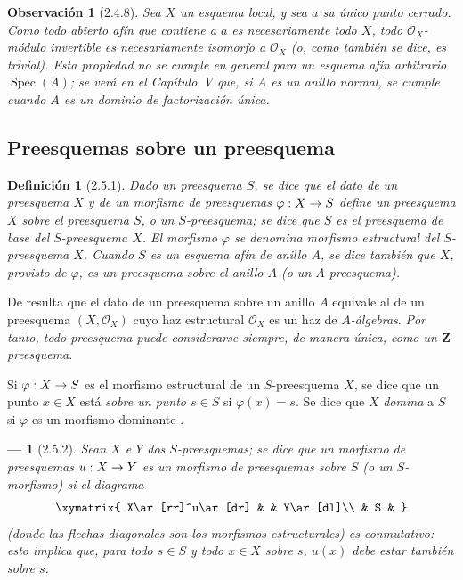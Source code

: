 \documentclass[oneside]{amsart}
\theoremstyle{ega-env-style}
\newtheorem*{env}{---}
\theoremstyle{ega-thm-env-style}
\theoremstyle{ega-defn-env-style}
\newtheorem*{definition}{Definición}
\newtheorem*{remark}{Observación}
\renewcommand{\to}{\mathchoice{\longrightarrow}{\rightarrow}{\rightarrow}{\rightarrow}}
\let\EGAOriginalLabel\label
\renewcommand{\label}[1]{\phantomsection\EGAOriginalLabel{#1}}
\begin{document}
\begin{remark}[2.4.8]
\label{I.2.4.8}
Sea $X$ un esquema local, y sea $a$ su único punto cerrado.
Como todo abierto afín que contiene a $a$ es necesariamente todo $X$, todo $\mathscr{O}_X$-módulo \emph{invertible}  es necesariamente \emph{isomorfo a $\mathscr{O}_X$} (o, como también se dice, es \emph{trivial}).
Esta propiedad no se cumple en general para un esquema afín arbitrario $\operatorname{Spec}(A)$;
se verá en el Capítulo~V que, si $A$ es un anillo normal, se cumple cuando $A$ es un dominio de factorización única.
\end{remark}

\subsection{Preesquemas sobre un preesquema}
\label{subsection:I.2.5}

\begin{definition}[2.5.1]
\label{I.2.5.1}
Dado un preesquema $S$, se dice que el dato de un preesquema $X$ y de un morfismo de preesquemas $\varphi:X\to S$ define un preesquema $X$ \emph{sobre el preesquema $S$}, o un $S$-preesquema;
se dice que $S$ es el preesquema de base del $S$-preesquema $X$.
El morfismo $\varphi$ se denomina morfismo estructural del $S$-preesquema $X$.
Cuando $S$ es un esquema afín de anillo $A$, se dice también que $X$, provisto de $\varphi$, es un preesquema \textup{sobre el anillo} $A$ (o un \emph{$A$-preesquema}).
\end{definition}

De  resulta que el dato de un preesquema sobre un anillo $A$ equivale al de un preesquema $(X,\mathscr{O}_X)$ cuyo haz estructural $\mathscr{O}_X$ es un haz de \emph{$A$-álgebras}.
\emph{Por tanto, todo preesquema puede considerarse siempre, de manera única, como un $\mathbf{Z}$-preesquema}.

Si $\varphi:X\to S$ es el morfismo estructural de un $S$-preesquema $X$, se
dice que un punto $x\in X$ está \emph{sobre un punto $s\in S$} si $\varphi(x)=s$. Se
dice que $X$ \emph{domina} a $S$ si $\varphi$ es un morfismo dominante .

\begin{env}[2.5.2]
\label{I.2.5.2}
Sean $X$ e $Y$ dos $S$-preesquemas;
se dice que un morfismo de preesquemas $u:X\to Y$ es un \emph{morfismo de preesquemas sobre $S$} (o un \emph{$S$-morfismo}) si el diagrama
\label{I.2.5.2.diagram-fr}
\[
  \xymatrix{
    X\ar[rr]^u\ar[dr] & & Y\ar[dl]\\
    & S &
  }
\]
(donde las flechas diagonales son los morfismos estructurales) es conmutativo: esto implica que, para todo $s\in S$ y todo $x\in X$ sobre $s$, $u(x)$ debe estar también sobre $s$.
\end{env}
\end{document}
